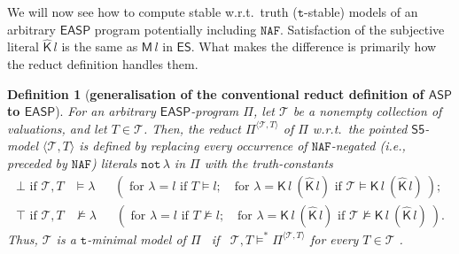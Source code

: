 \documentclass[submission,copyright,creativecommons]{eptcs}
\newcommand{\tuple}[1]  { \langle #1 \rangle }
\newcommand{\logic}[1]  { \ensuremath{\mathsf{#1}} }
\newcommand{\sfive}  { \logic{S5} }
\newcommand{\ASP}  { \logic{ASP} }
\newcommand{\ES}  { \logic{ES} }
\newcommand{\EASP}  { \logic{EASP} }
\newcommand{\naf}  { \texttt{NAF} }
\newcommand{\lpnot}  { \mathtt{not} \, }
\newcommand{\epispec}  { \Pi }
\newcommand{\K}  { \mathsf{K} }
\newcommand{\M}  { \mathsf{M} }
\newcommand{\Khat}  { \hat{\mathsf{K}} }
\newcommand{\starmodels}  { \models^* }
\newtheorem{definition}{Definition}
\begin{document}
We will now see how to compute stable w.r.t.\ truth ($\texttt{t}$-stable) 
models of an arbitrary $\EASP$ program potentially including $\naf$.
%
Satisfaction of the subjective literal $\Khat\,l$ is the same as $\M\,l$ in $\ES$. 
What makes the
difference is primarily how the reduct definition handles them.
%
\begin{definition} [\textbf{generalisation of the conventional reduct 
definition of $\ASP$ to $\EASP$}]
\label{defn:epis.reduct} \normalfont  
For an arbitrary $\EASP$-program $\epispec$, let $\mathcal T$ 
be a nonempty collection of 
valuations, and let $T \in \mathcal T$.
Then, the reduct $\epispec^{\tuple{\mathcal T,T}}$ of $\epispec$
w.r.t.\ the pointed $\sfive$-model $\tuple{\mathcal T,T}$ is defined by
replacing every occurrence of $\naf$-negated (i.e., preceded by $\naf$) 
literals $\lpnot \lambda$ in $\epispec$ with the truth-constants
%
\begin{align*}
\bot \text{ \ if \ } \mathcal T,T &\models \lambda ~~~~~~~
(\text{ for } \lambda=l  \text{ \ if \ } T \models l;~~~ 
\text{ for } \lambda=\K\,l \ (\Khat\,l) \text{  \ if \ } 
\mathcal T \models \K\,l \ (\Khat\, l) \ );
\\
\top \text{ \ if \ } \mathcal T, T &\not\models \lambda  ~~~~~~~
(\text{ for } \lambda=l \text{  \ if \ } T \not\models l;~~~ 
\text{ for } \lambda=\K\,l \ (\Khat\,l) \text{ \ if \ } \mathcal T \not\models \K\,l \ (\Khat\,l) \ ).
\end{align*}
%
Thus, $\mathcal T$ is a \emph{$\texttt{t}$-minimal model} of 
$\epispec$ \, if \, $\mathcal T, T \starmodels \epispec^{\tuple{\mathcal T, T}}$ 
for every $T \in \mathcal T$ \cite{Su19jelia}.
\end{definition}
\end{document}
